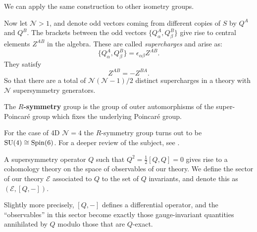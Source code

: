 	We can apply the same construction to other isometry groups.
	
	Now let $\mathcal N > 1$, and denote odd vectors coming from different copies of $S$ by $Q^A$ and $Q^B$. The brackets between the odd vectors $\{Q^A_\alpha, Q^B_\beta \} $ give rise to  central elements $Z^{AB}$ in the algebra. These are called \emph{supercharges} and arise as:
	$$\{Q^A_\alpha, Q^B_\beta \} = \epsilon_{\alpha \beta} Z^{AB}.$$
	They satisfy
	$$Z^{AB} = -Z^{BA}.$$
	So that there are a total of $\mathcal N (\mathcal N - 1)/2$ distinct supercharges in a theory with $\mathcal N$ supersymmetry generators. 
	
	\begin{defn}
		The \textbf{$R$-symmetry} group is the group of outer automorphisms of the super-Poincar\'e group which fixes the underlying Poincar\'e group. 
	\end{defn}
	For the case of 4D $\mathcal N = 4$ the $R$-symmetry group turns out to be $\mathrm{SU}(4) \cong \mathrm{Spin}(6)$. For a deeper review of the subject, see \cite{quevedo2010}.
	
	\begin{phys}[Sector]
		A supersymmetry operator $Q$ such that $Q^2 = \frac{1}{2} [Q, Q] = 0$ gives rise to a cohomology theory on the space of observables of our theory. We define the sector of our theory $\mathcal E$ associated to $Q$ to the set of $Q$ invariants, and denote this as $(\mathcal E, [Q, -])$.
		
		Slightly more precisely, $[Q, -]$ defines a differential operator, and the ``observables'' in this sector become exactly those gauge-invariant quantities annihilated by $Q$ modulo those that are $Q$-exact.
	\end{phys}

	
